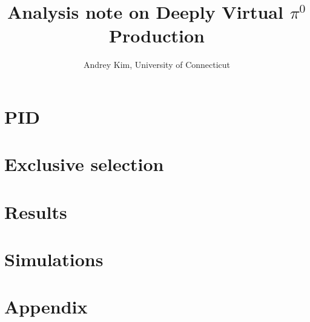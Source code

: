 \documentclass[11pt]{report}
\title{Analysis note on Deeply Virtual $\pi^0$ Production}
\author{
Andrey Kim, University of Connecticut\\
}
\date{}
\begin{document}
\maketitle
\tableofcontents

\chapter{PID}


\chapter{Exclusive selection}


\chapter{Results}


\chapter{Simulations}


\chapter{Appendix}

\end{document}
